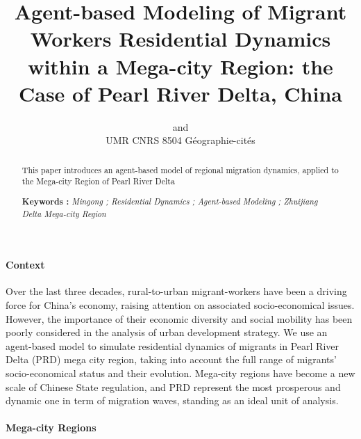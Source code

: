 

\def \draft {0}



\title{Agent-based Modeling of Migrant Workers Residential Dynamics within a Mega-city Region: the Case of Pearl River Delta, China
}
\author{ and \\
UMR CNRS 8504 Géographie-cités
}
\date{}




\maketitle

\justify


\begin{abstract}
This paper introduces an agent-based model of regional migration dynamics, applied to the Mega-city Region of Pearl River Delta

\bigskip

\noindent\textbf{Keywords : } \textit{Mingong ; Residential Dynamics ; Agent-based Modeling ; Zhuijiang Delta Mega-city Region}
\end{abstract}





\paragraph{Context}

Over the last three decades, rural-to-urban migrant-workers have been a driving force for China's economy, raising attention on associated socio-economical issues. However, the importance of their economic diversity and social mobility has been poorly considered in the analysis of urban development strategy.
We use an agent-based model to simulate residential dynamics of migrants in Pearl River Delta (PRD) mega city region, taking into account the full range of migrants’ socio-economical status and their evolution. Mega-city regions have become a new scale of Chinese State regulation, and PRD represent the most prosperous and dynamic one in term of migration waves, standing as an ideal unit of analysis.

\paragraph{Mega-city Regions}

